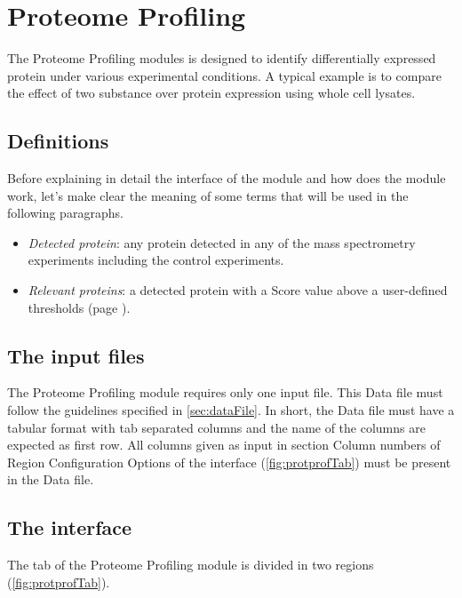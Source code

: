 \chapter{Proteome Profiling}
\label{chap:protprof}

The Proteome Profiling modules is designed to identify differentially expressed
protein under various experimental conditions. A typical example is to compare the
effect of two substance over protein expression using whole cell lysates.

\section{Definitions}

Before explaining in detail the interface of the module and how does the module work, 
let's make clear the meaning of some terms that will be used in the following paragraphs.

\begin{itemize}
    \item \textit{Detected protein}: any protein detected in any of the mass spectrometry
    experiments including the control experiments.
    \item \textit{Relevant proteins}: a detected protein with a Score value above
    a user-defined thresholds (page \pageref{par:protprofScoreValue}).
\end{itemize}

\section{The input files}

The Proteome Profiling module requires only one input file. This Data file must follow
the guidelines specified in \autoref{sec:dataFile}. In short, the Data file must
have a tabular format with tab separated columns and the name of the columns are
expected as first row. All columns given as input in section Column numbers of Region
Configuration Options of the interface (\autoref{fig:protprofTab}) must be present
in the Data file.

\section{The interface}

The tab of the Proteome Profiling module is divided in two regions (\autoref{fig:protprofTab}).

